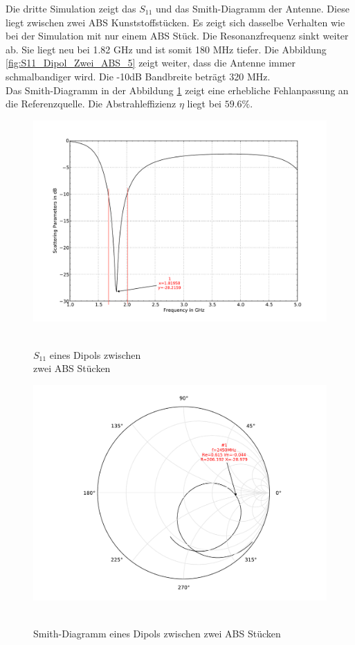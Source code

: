 \newpage
Die dritte Simulation zeigt das $S_{11}$ und das Smith-Diagramm der Antenne. Diese liegt zwischen zwei ABS Kunststoffstücken. Es zeigt sich dasselbe Verhalten wie bei der Simulation mit nur einem ABS Stück. Die Resonanzfrequenz sinkt weiter ab. Sie liegt neu bei 1.82 GHz und ist somit 180 MHz tiefer. Die Abbildung  \ref{fig:S11_Dipol_Zwei_ABS_5} zeigt weiter, dass die Antenne immer schmalbandiger wird. Die -10dB Bandbreite beträgt 320 MHz.\\
Das Smith-Diagramm in der Abbildung \ref{fig:Smith_Dipol_Zwei_ABS_6} zeigt eine erhebliche Fehlanpassung an die Referenzquelle. Die Abstrahleffizienz $\eta$ liegt  bei $59.6 \%$.

\begin{figure}[!ht]
\begin{center}
  \includegraphics[width=\linewidth]{content/bilder/Evaluation/Dipol/S11DipolZweiABS.pdf}
  \caption{\\$S_{11}$ eines Dipols zwischen \\zwei ABS Stücken}\label{fig:S11_Dipol_Zwei_ABS_5}
\endminipage%
{}
  \includegraphics[width=\linewidth]{content/bilder/Evaluation/Dipol/SmithDipolZweiABS.pdf}
  \caption{\\Smith-Diagramm eines Dipols zwischen zwei ABS Stücken}\label{fig:Smith_Dipol_Zwei_ABS_6}
\endminipage
\end{center}
\end{figure}


